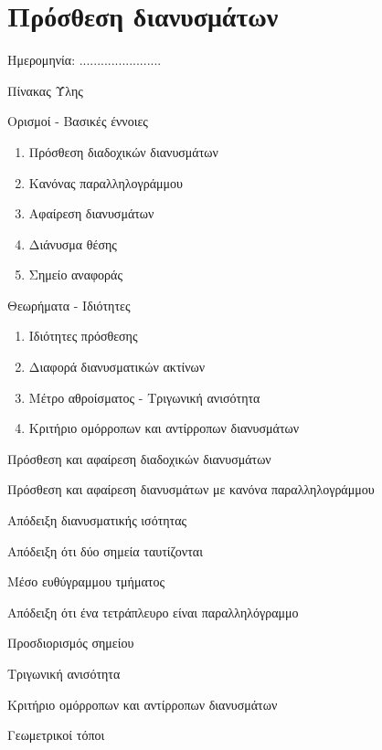 \documentclass[internet]{frontisthrio}
\newcommand{\myitem}{\stepcounter{enumi}\item[\raisebox{0.5mm}{\faExclamationTriangle}\ \Large$\square$]}
\begin{document}
\section{Πρόσθεση διανυσμάτων}
\begin{flushright}
\faCalendar* Ημερομηνία: .......................
\end{flushright}
\begin{mybox}[mysubtitle]{Πίνακας Ύλης}
\begin{tcbraster}[raster columns=2,raster equal height]
\begin{myleftbox}{Ορισμοί - Βασικές έννοιες\ \ \faBook}
\begin{enumerate}[itemsep=0mm]
\item Πρόσθεση διαδοχικών διανυσμάτων
\item Κανόνας παραλληλογράμμου
\item Αφαίρεση διανυσμάτων
\item Διάνυσμα θέσης
\item Σημείο αναφοράς
\end{enumerate}
\end{myleftbox}
\begin{myrightbox}{Θεωρήματα - Ιδιότητες\ \ \faTools}
\begin{enumerate}[itemsep=0mm]
\item Ιδιότητες πρόσθεσης
\item Διαφορά διανυσματικών ακτίνων
\item Μέτρο αθροίσματος - Τριγωνική ανισότητα
\item Κριτήριο ομόρροπων και αντίρροπων διανυσμάτων
\end{enumerate}
\end{myrightbox}
\end{tcbraster}
\begin{multicols}{2}
\begin{todolist}[itemsep=0mm]
\myitem Πρόσθεση και αφαίρεση διαδοχικών διανυσμάτων
\myitem Πρόσθεση και αφαίρεση διανυσμάτων με κανόνα παραλληλογράμμου
\myitem Απόδειξη διανυσματικής ισότητας
\item Απόδειξη ότι δύο σημεία ταυτίζονται
\item Μέσο ευθύγραμμου τμήματος
\myitem Απόδειξη ότι ένα τετράπλευρο είναι παραλληλόγραμμο
\item Προσδιορισμός σημείου
\item Τριγωνική ανισότητα
\item Κριτήριο ομόρροπων και αντίρροπων διανυσμάτων
\item Γεωμετρικοί τόποι

\end{todolist}
\end{multicols}
\end{mybox}
\end{document}
